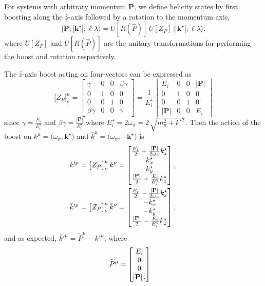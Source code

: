 For systems with arbitrary momentum $\textbf{P}$, we define helicity states by first boosting along the $\hat{z}$-axis followed by a rotation to the momentum axis,
\begin{equation}
\big| \textbf{P}; |\textbf{k}^\star|; \ell \lambda \big\rangle = U[R(\hat{P})]\, U[Z_P]\,  \big| |\textbf{k}^\star|; \ell \lambda \big\rangle.
\end{equation}
where $U[Z_P]$ and $U[R(\hat{P})]$ are the unitary transformations for performing the boost and rotation respectively. 

The $\hat{z}$-axis boost acting on four-vectors can be expressed as
\begin{equation}
	\big[ Z_P \big]^\mu_\nu = 
		\begin{bmatrix} 
			\gamma & 0 & 0 & \beta \gamma \\
			0 & 1 & 0 & 0 \\
			0 & 0 & 1 & 0 \\
			\beta \gamma & 0 & 0 & \gamma	
		\end{bmatrix}
		= \frac{1}{E_i^\star}
		\begin{bmatrix} 
			E_i & 0 & 0 & |\textbf{P}|\\
			0 & 1 & 0 & 0 \\
			0 & 0 & 1 & 0 \\
			|\textbf{P}| & 0 & 0 & E_i	
		\end{bmatrix}
\end{equation}
since $\gamma = \frac{E_i}{ E_i^\star}$ and $\beta \gamma = \frac{|\textbf{P}|}{E_i^\star}$ where $E_i^\star=2\omega_\pi = 2\,\sqrt{m_\pi^2 + k^{\star 2}}$. Then the action of the boost on $k^\mu = \big(\omega_\pi, \textbf{k}^\star\big)$ and ${\bar{k}^\mu = \big(\omega_\pi , -\textbf{k}^\star \big)}$ is
\begin{align}
k'^\mu &= \big[ Z_P \big]^\mu_\nu \, k^\nu = 
	\begin{bmatrix} \tfrac{E_i}{2} + \tfrac{|\textbf{P}|}{2\omega_\pi} k^\star_z \\ k^\star_x \\ k^\star_y \\ \tfrac{|\textbf{P}|}{2} + \tfrac{E_i}{E_i^\star} k^\star_z \end{bmatrix},
	\quad \quad\quad\nonumber\\
\bar{k}'^\mu &= \big[ Z_P \big]^\mu_\nu \, \bar{k}^\nu = 
	\begin{bmatrix} \tfrac{E_i}{2} - \tfrac{|\textbf{P}|}{2\omega_\pi} k^\star_z \\ -k^\star_x \\ -k^\star_y \\ \tfrac{|\textbf{P}|}{2} - \tfrac{E_i}{E_i^\star} k^\star_z \end{bmatrix},	
\end{align}
and as expected, $\bar{k}'^\mu = \widetilde{P}^\mu - k'^\mu$, where
\begin{align}
\widetilde{P}^\mu&=\begin{bmatrix}
E_i\\
0\\
0\\
|{\bf P}|\, .
\end{bmatrix}
\end{align}

